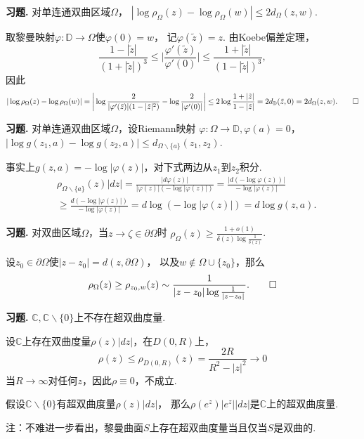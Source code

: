 \textbf{习题. } 对单连通双曲区域$\Omega$，
$|\log\rho_\Omega(z)-\log\rho_\Omega(w)|\leq2d_\Omega(z,w)$.

\begin{proofc}
    取黎曼映射$\varphi\colon\mathbb{D}\rightarrow\Omega$使$\varphi(0)=w$，
    记$\varphi(\tilde{z})=z$. 由Koebe偏差定理，
    $$\frac{1-|\tilde{z}|}{(1+|\tilde{z}|)^3}
    \leq\bigg|\frac{\varphi'(\tilde{z})}{\varphi'(0)}\bigg|
    \leq\frac{1+|\tilde{z}|}{(1-|\tilde{z}|)^3},$$因此
    $$|\log\rho_\Omega(z)-\log\rho_\Omega(w)|
    =\bigg|\log\frac{2}{|\varphi'(\tilde{z})|(1-|\tilde{z}|^2)}
    -\log\frac{2}{|\varphi'(0)|}\bigg|
    \leq2\log\frac{1+|\tilde{z}|}{1-|\tilde{z}|}
    =2d_\mathbb{D}(\tilde{z},0)=2d_\Omega(z,w).\qedhere$$
\end{proofc}

\textbf{习题. } 对单连通双曲区域$\Omega$，设Riemann映射
$\varphi\colon\Omega\rightarrow\mathbb{D},\varphi(a)=0$，
$|\log g(z_1,a)-\log g(z_2,a)|\leq d_{\Omega\backslash\{a\}}(z_1,z_2)$.

\begin{proofc}
    事实上$g(z,a)=-\log|\varphi(z)|$，对下式两边从$z_1$到$z_2$积分.
    \begin{align*}&\rho_{\Omega\backslash\{a\}}(z)|dz|
    =\frac{|d\varphi(z)|}{|\varphi(z)|(-\log|\varphi(z)|)}
    =\frac{|d(-\log\varphi(z))|}{-\log|\varphi(z)|}\\
    &\geq\frac{d(-\log|\varphi(z)|)}{-\log|\varphi(z)|}=d\log(-\log|\varphi(z)|)
    =d\log g(z,a).\end{align*}
\end{proofc}
\textbf{习题. } 对双曲区域$\Omega$，当$z\rightarrow\zeta\in\partial\Omega$时
$\displaystyle{\rho_\Omega(z)\geq\frac{1+o(1)}{\delta(z)\log\frac{1}{\delta(z)}}}$.

\begin{proofc}
    设$z_0\in\partial\Omega$使$|z-z_0|=d(z,\partial\Omega)$，
    以及$w\notin\Omega\cup\{z_0\}$，那么
    $$\rho_\Omega(z)\geq\rho_{z_0,w}(z)
    \sim\frac{1}{|z-z_0|\log\frac{1}{|z-z_0|}}.\qedhere$$
\end{proofc}

\textbf{习题. } $\mathbb{C},\mathbb{C}\backslash\{0\}$上不存在超双曲度量.

\begin{proofc}
    设$\mathbb{C}$上存在双曲度量$\rho(z)|dz|$，在$D(0,R)$上，
    $$\rho(z)\leq\rho_{D(0,R)}(z)=\frac{2R}{R^2-|z|^2}\rightarrow0$$
    当$R\rightarrow\infty$对任何$z$，因此$\rho\equiv0$，不成立.

    假设$\mathbb{C}\backslash\{0\}$有超双曲度量$\rho(z)|dz|$，
    那么$\rho(e^z)|e^z||dz|$是$\mathbb{C}$上的超双曲度量.\qedhere

    注：不难进一步看出，黎曼曲面$S$上存在超双曲度量当且仅当$S$是双曲的.
\end{proofc}

